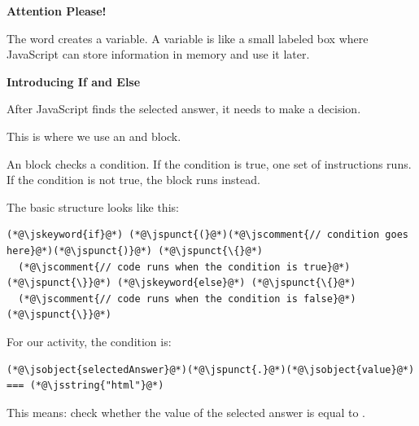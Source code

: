 \documentclass{article}
\begin{document}
\vspace{0.3cm}

\begin{attentionbox}
  \textbf{\Bitter\textcolor{naranja}{Attention Please!}}

  The word  creates a variable.
  A variable is like a small labeled box where JavaScript can store information in memory and use it later.
\end{attentionbox}

\vspace{0.4cm}

\textbf{\Bitter\textcolor{naranja}{Introducing If and Else}}

\vspace{0.1cm}

After JavaScript finds the selected answer, it needs to make a decision.

This is where we use an  and  block.

An  block checks a condition.
If the condition is true, one set of instructions runs.
If the condition is not true, the  block runs instead.

\vspace{0.2cm}

The basic structure looks like this:

\begin{lstlisting}
(*@\jskeyword{if}@*) (*@\jspunct{(}@*)(*@\jscomment{// condition goes here}@*)(*@\jspunct{)}@*) (*@\jspunct{\{}@*)
  (*@\jscomment{// code runs when the condition is true}@*)
(*@\jspunct{\}}@*) (*@\jskeyword{else}@*) (*@\jspunct{\{}@*)
  (*@\jscomment{// code runs when the condition is false}@*)
(*@\jspunct{\}}@*)
\end{lstlisting}

\vspace{0.2cm}

For our activity, the condition is:

\vspace{0.1cm}

\begin{lstlisting}
(*@\jsobject{selectedAnswer}@*)(*@\jspunct{.}@*)(*@\jsobject{value}@*) === (*@\jsstring{"html"}@*)
\end{lstlisting}

\vspace{0.2cm}

This means: check whether the value of the selected answer is equal to .
\end{document}
